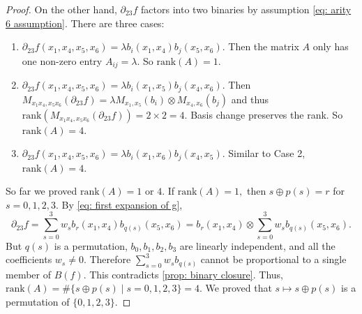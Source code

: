 \begin{proof}
    On the other hand, $\partial_{23}f$ factors into two binaries by assumption \eqref{eq: arity 6 assumption}.
    There are three cases:
    \begin{enumerate}
        \item $\partial_{23}f(x_1,x_4,x_5,x_6)=\lambda b_{i}(x_1,x_4)b_j(x_5,x_6)$.
        Then the matrix $A$ only has one non-zero entry $A_{ij}=\lambda.$
        So $\mathrm{rank}(A)=1.$
        \item $\partial_{23}f(x_1,x_4,x_5,x_6)=\lambda b_{i}(x_1,x_5)b_j(x_4,x_6)$.
        Then $M_{x_1x_4,x_5x_6}(\partial_{23}f)=\lambda M_{x_1,x_5}(b_i)\otimes M_{x_4,x_6}(b_j)$ and thus $\mathrm{rank}(M_{x_1x_4,x_5x_6}(\partial_{23}f))=2\times 2=4.$
        Basis change preserves the rank.
        So $\mathrm{rank}(A)=4.$
        \item $\partial_{23}f(x_1,x_4,x_5,x_6)=\lambda b_{i}(x_1,x_6)b_j(x_4,x_5)$.
        Similar to Case 2, $\mathrm{rank}(A)=4.$
    \end{enumerate}
    So far we proved $\mathrm{rank}(A)=1$ or $4$.
    If $\mathrm{rank}(A)=1,$ then $s\oplus p(s)=r$ for $s=0,1,2,3.$
    By \eqref{eq: first expansion of g}, $$\partial_{23}f=\sum_{s=0}^3w_sb_r(x_1,x_4)b_{q(s)}(x_5,x_6)=b_r(x_1,x_4)\otimes \sum_{s=0}^3w_sb_{q(s)}(x_5,x_6).$$
    But $q(s)$ is a permutation, \(b_0,b_1,b_2,b_3\) are linearly independent, and all the coefficients $w_s\neq 0$.
    Therefore $\sum_{s=0}^3 w_s b_{q(s)}$ cannot be proportional to a single member of \(B(f)\).
    This contradicts \cref{prop: binary closure}.
    Thus, $\mathrm{rank}(A)=\#\{s\oplus p(s)\mid s=0,1,2,3\}=4.$
    We proved that $s\mapsto s\oplus p(s)$ is a permutation of $\{0,1,2,3\}.$


\end{proof}
